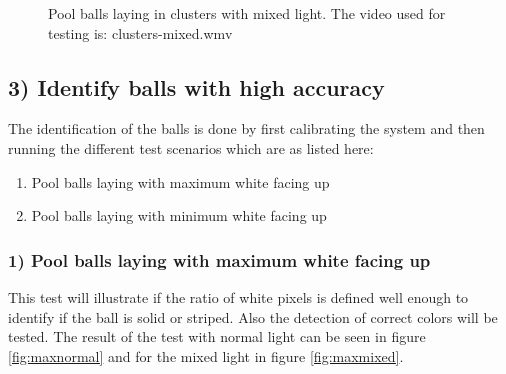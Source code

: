 
\begin{figure}[H]
  \centering
   \caption{Pool balls laying in clusters with mixed light.  The video used for testing is: clusters-mixed.wmv}
  \label{fig:clustersmixed}
\end{figure}


\subsection{3) Identify balls with high accuracy}

The identification of the balls is done by first calibrating the system and then running the different test scenarios which are as listed here:

\begin{enumerate}
\setlength{\itemsep}{0mm}
	\item Pool balls laying with maximum white facing up\\
	\item Pool balls laying with minimum white facing up\\
\end{enumerate}

\subsubsection{1) Pool balls laying with maximum white facing up}
This test will illustrate if the ratio of white pixels is defined well enough to identify if the ball is solid or striped. Also the detection of correct colors will be tested. The result of the test with normal light can be seen in figure \ref{fig:maxnormal} and for the mixed light in figure \ref{fig:maxmixed}.


